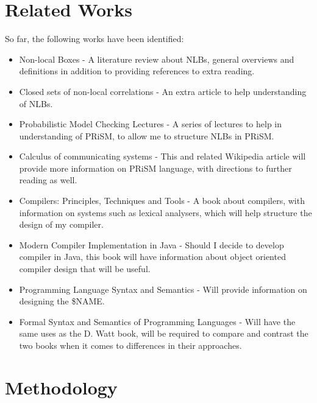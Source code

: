 \documentclass[11pt, a4paper]{article}
\begin{document}

\section{Related Works} %
\label{sec:related_works}
So far, the following works have been identified:
\begin{itemize}
    \item Non-local Boxes \cite{nlb_lamontague} - A literature review about
    NLBs, general overviews and definitions in addition to providing references
    to extra reading.
    \item Closed sets of non-local correlations \cite{Jonathan-Allcock:2009pd} -
    An extra article to help understanding of NLBs.
    \item Probabilistic Model Checking Lectures \cite{prism_lectures} - A series
    of lectures to help in understanding of PRiSM, to allow me to structure
    NLBs in PRiSM.
    \item Calculus of communicating systems - This and related Wikipedia article
    will provide more information on PRiSM language, with directions to further
    reading as well. 
    \item Compilers: Principles, Techniques and Tools \cite{dragon_compiler} - A
    book about compilers, with information on systems such as lexical analysers,
    which will help structure the design of my compiler.
    \item Modern Compiler Implementation in Java \cite{java_compiler} - Should I
    decide to develop compiler in Java, this book will have information about
    object oriented compiler design that will be useful.
    \item Programming Language Syntax and Semantics \cite{plss} - Will provide
    information on designing the \$NAME.
    \item Formal Syntax and Semantics of Programming Languages \cite{fsspl} -
    Will have the same uses as the D. Watt book, will be required to compare and
    contrast the two books when it comes to differences in their approaches.
\end{itemize}


\section{Methodology} %
\label{sec:methodology}

\end{document}
